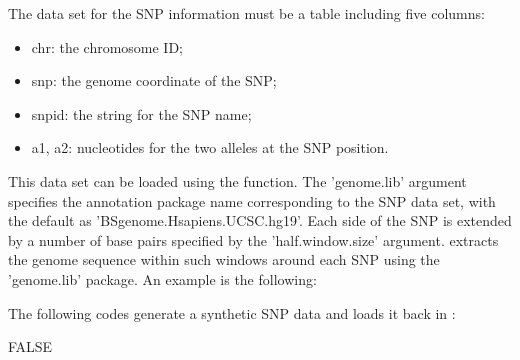 \documentclass[a4paper,10pt]{article}
\begin{document}

The data set for the SNP information must be a table including five columns:

\begin{itemize}
\item chr: the chromosome ID;
\item snp: the genome coordinate of the SNP;
\item snpid: the string for the SNP name;
\item a1, a2: nucleotides for the two alleles at the SNP position.
\end{itemize}
  

This data set can be loaded using the  function. The 'genome.lib' argument specifies the annotation package name corresponding to the SNP data set, with the default as 'BSgenome.Hsapiens.UCSC.hg19'. Each side of the SNP is extended by a number of base pairs specified by the 'half.window.size' argument.  extracts the genome sequence within such windows around each SNP using the 'genome.lib' package. An example is the following:

The following codes generate a synthetic SNP data and loads it back in \R{}:
\begin{Schunk}
\begin{Soutput}
[1] FALSE
\end{Soutput}
\end{Schunk}
\end{document}
